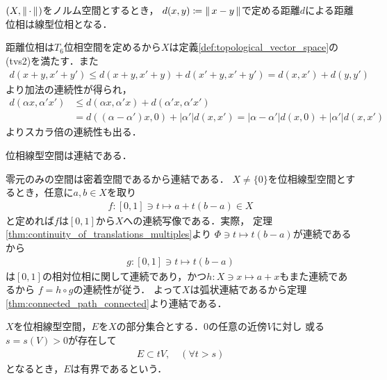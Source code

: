 	\begin{screen}
		\begin{thm}[ノルムで導入する距離位相は線型位相]
			$(X,\left\|\, \cdot\, \right\|_{})$をノルム空間とするとき，
			$d(x,y) \coloneqq \left\|\, x-y\, \right\|_{}$で定める距離$d$による距離位相は線型位相となる．
		\end{thm}
	\end{screen}
	
	\begin{prf}
		距離位相は$T_6$位相空間を定めるから$X$は定義\ref{def:topological_vector_space}の(tvs2)を満たす．また
		\begin{align}
			d(x+y,x'+y') \leq d(x+y,x'+y) + d(x'+y,x'+y') = d(x,x') + d(y,y')
		\end{align}
		より加法の連続性が得られ，
		\begin{align}
			d(\alpha x, \alpha'x') &\leq d(\alpha x, \alpha'x) + d(\alpha'x,\alpha'x') \\
			&= d((\alpha - \alpha') x, 0) + |\alpha'|d(x,x')
			= |\alpha-\alpha'|d(x,0) + |\alpha'|d(x,x')
		\end{align}
		よりスカラ倍の連続性も出る．
		\QED
	\end{prf}
	
	\begin{screen}
		\begin{thm}[位相線型空間の連結性]\label{thm:topological_vector_spaces_connected}
			位相線型空間は連結である．
		\end{thm}
	\end{screen}
	
	\begin{prf}
		零元のみの空間は密着空間であるから連結である．
		$X \neq \{0\}$を位相線型空間とするとき，任意に$a,b \in X$を取り
		\begin{align}
			f:[0,1] \ni t \longmapsto a + t(b - a) \in X
		\end{align}
		と定めれば$f$は$[0,1]$から$X$への連続写像である．実際，
		定理\ref{thm:continuity_of_translations_multiples}より
		$\Phi \ni t \longmapsto t(b-a)$が連続であるから
		\begin{align}
			g:[0,1] \ni t \longmapsto t(b-a)
		\end{align}
		は$[0,1]$の相対位相に関して連続であり，かつ$h:X \ni x \longmapsto a + x$もまた連続であるから
		$f = h \circ g$の連続性が従う．
		よって$X$は弧状連結であるから定理\ref{thm:connected_path_connected}より連結である．
		\QED
	\end{prf}
	
	\begin{screen}
		\begin{dfn}[位相線形空間の有界集合]\label{def:boundedness_in_tvs}
			$X$を位相線型空間，$E$を$X$の部分集合とする．0の任意の近傍$V$に対し
			或る$s = s(V) > 0$が存在して
			\begin{align}
				E \subset t V, \quad (\forall t > s)
			\end{align}
			となるとき，$E$は有界であるという．
		\end{dfn}
	\end{screen}
	
